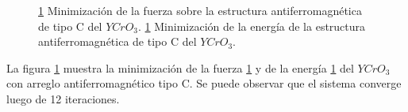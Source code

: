 \begin{figure}[H]
    \centering
    \singlespace
    \caption[Minimizaci\'on de la fuerza y la energ\'ia del $YCrO_{3}$ con 
    arreglo antiferromagn\'etico tipo 
    C]{\ref{minimizacion_yco_C}  Minimizaci\'on de la 
        fuerza sobre la estructura antiferromagn\'etica de tipo C del 
        $YCrO_{3}$. 
        \ref{minimizacion_yco_C}  Minimizaci\'on de la 
        energ\'ia de la estructura antiferromagn\'etica de tipo C del 
        $YCrO_{3}$.}
    \label{minimizacion_yco_C}
\end{figure}

\noindent La figura \ref{minimizacion_yco_C} muestra la minimizaci\'on de la 
fuerza \ref{minimizacion_yco_C}  y de la energ\'ia 
\ref{minimizacion_yco_C}  del $YCrO_{3}$ con arreglo 
antiferromagn\'etico tipo C. Se puede observar que el sistema converge luego de 
12 iteraciones.


